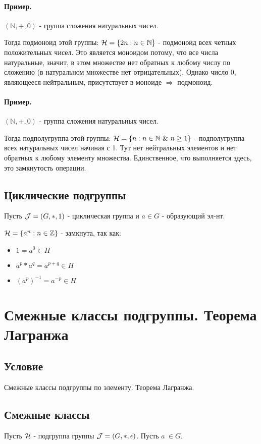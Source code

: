 \documentclass{report}
\newcommand{\band}{\mbox{ } \& \mbox{ }}
\begin{document}
\paragraph*{Пример.}
$(\mathbb{N}, +, 0)$ - группа сложения натуральных чисел.

Тогда подмоноид этой группы: ${\cal H} = \{2n:n \in \mathbb{N}\}$ - подмоноид всех четных положительных чисел.
Это является моноидом потому, что все числа натуральные, значит, в этом множестве
нет обратных к любому числу по сложению (в натуральном множестве нет отрицательных). Однако
число 0, являющееся нейтральным, присутствует в моноиде $\Rightarrow$ подмоноид.

\paragraph*{Пример.}
$(\mathbb{N}, +, 0)$ - группа сложения натуральных чисел.

Тогда подполугруппа этой группы: ${\cal H} = \{n:n \in \mathbb{N} \band n \geq 1\}$ - подполугруппа всех
натуральных чисел начиная с 1.
Тут нет нейтральных элементов и нет обратных к любому элементу множества.
Единственное, что выполняется здесь, это замкнутость операции.

\subsection{Циклические подгруппы}
Пусть ${\cal J} = (G, *, 1)$ - циклическая группа и $a \in G$ - образующий эл-нт.

${\cal H} = \{a^{n}: n \in \mathbb{Z}\}$ - замкнута, так как:
\begin{itemize}
	\item $1 = a^{0} \in H$
	\item $a^p * a^q = a^{p+q} \in H$
	\item $(a^p)^{-1} = a^{-p} \in H$
\end{itemize}

\newpage

\section{Смежные классы подгруппы. Теорема Лагранжа}
\subsection{Условие}
Смежные классы подгруппы по элементу. Теорема Лагранжа.

\subsection{Смежные классы}
Пусть $\cal H$ - подгруппа группы ${\cal J} = (G, *, \epsilon)$. Пусть $a\ \in G$.
\end{document}
